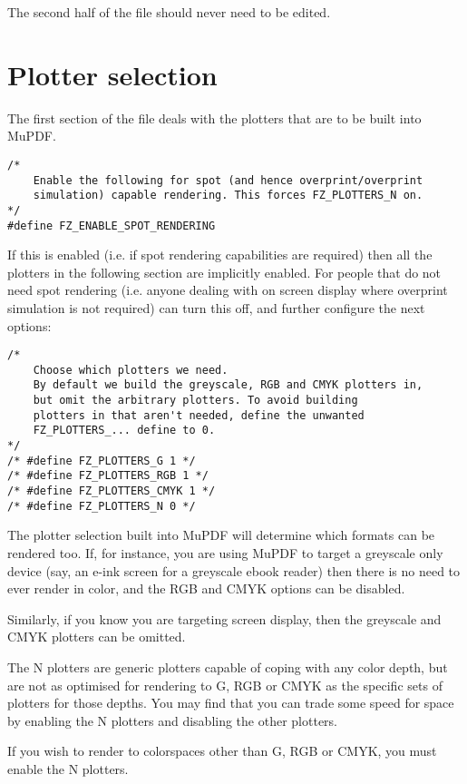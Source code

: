 \documentclass[oneside]{book}
\begin{document}
The second half of the file should never need to be edited.

\section{Plotter selection}

The first section of the file deals with the plotters that are to be built into MuPDF.

\begin{lstlisting}
/*
	Enable the following for spot (and hence overprint/overprint
	simulation) capable rendering. This forces FZ_PLOTTERS_N on.
*/
#define FZ_ENABLE_SPOT_RENDERING
\end{lstlisting}

If this is enabled (i.e. if spot rendering capabilities are required) then all the plotters in the following section are implicitly enabled. For people that do not need spot rendering (i.e. anyone dealing with on screen display where overprint simulation is not required) can turn this off, and further configure the next options:

\begin{lstlisting}
/*
	Choose which plotters we need.
	By default we build the greyscale, RGB and CMYK plotters in,
	but omit the arbitrary plotters. To avoid building
	plotters in that aren't needed, define the unwanted
	FZ_PLOTTERS_... define to 0.
*/
/* #define FZ_PLOTTERS_G 1 */
/* #define FZ_PLOTTERS_RGB 1 */
/* #define FZ_PLOTTERS_CMYK 1 */
/* #define FZ_PLOTTERS_N 0 */
\end{lstlisting}

The plotter selection built into MuPDF will determine which formats can be rendered too. If, for instance, you are using MuPDF to target a greyscale only device (say, an e-ink screen for a greyscale ebook reader) then there is no need to ever render in color, and the RGB and CMYK options can be disabled.

Similarly, if you know you are targeting screen display, then the greyscale and CMYK plotters can be omitted.

The N plotters are generic plotters capable of coping with any color depth, but are not as optimised for rendering to G, RGB or CMYK as the specific sets of plotters for those depths. You may find that you can trade some speed for space by enabling the N plotters and disabling the other plotters.

If you wish to render to colorspaces other than G, RGB or CMYK, you must enable the N plotters.
\end{document}
